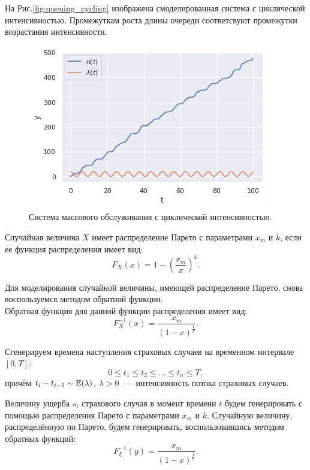 На Рис.\eqref{fig:queuing_cycling} изображена смоделированная система с 
 циклической интенсивностью. Промежуткам роста длины очереди соответсвуют
 промежутки возрастания интенсивности.
\begin{figure}[ht]
	\centering
	\includegraphics[width = 0.7\linewidth]{"./resources/queuing_cycling.png"}
	\caption{Система массового обслуживания с циклической интенсивностью.}
    \label{fig:queuing_cycling}
\end{figure}

\begin{definition}
	Случайная величина $X$ имеет распределение Парето с параметрами 
     $x_m$ и $k$, если ее функция распределения имеет вид:
	\begin{equation*}
	F_X(x) = 1 - \left(\frac{x_m}{x}\right)^k.
	\end{equation*}
\end{definition}
Для моделирования случайной величины, имеющей распределение Парето, 
 снова воспользуемся методом обратной функции.\\
Обратная функция для данной функции распределения имеет вид:
\begin{equation}
F_X^{-1}(x) = \frac{x_m}{(1 - x)^{\frac{1}{k}}}.
\end{equation}

Сгенерируем времена наступления страховых случаев на временном интервале 
 \( [0,T] \):
\[
0 \leq t_1 \leq t_2 \leq \ldots \leq t_n \leq T,
\]
причём \( t_i-t_{i-1} \sim \operatorname{\mathbb{E}}(\lambda) \), \( \lambda>0 \)~---~интенсивность 
 потока страховых случаев.

Величину ущерба \( s_i \) страхового случая в момент времени \( t \) 
 будем генерировать с помощью распределения Парето с параметрами 
 \( x_m \) и \( k \). Случайную величину, распределённую по Парето, 
 будем генерировать, воспользовавшись методом обратных функций:
\[
F_{\xi}^{-1}(y)=\dfrac{x_m}{\left(1-x\right)^{\frac{1}{k}}}.
\]

